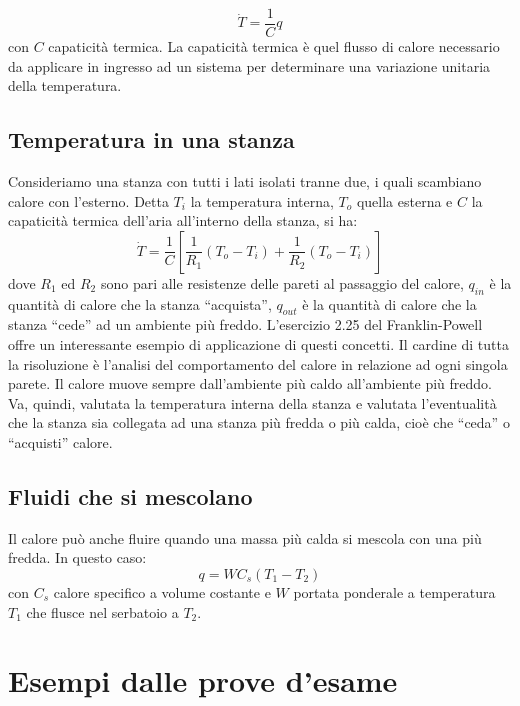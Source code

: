 \documentclass[a4paper]{report}
\begin{document}
\begin{equation}
\dot{T} = \frac{1}{C}q
\end{equation}
con $C$ capaticit\`a termica. La capaticit\`a termica \`e quel flusso
di calore necessario da applicare in ingresso ad un sistema per
determinare una variazione unitaria della temperatura.

\subsection{Temperatura in una stanza}
Consideriamo una stanza con tutti i lati isolati tranne due, i quali
scambiano calore con l'esterno. Detta $T_i$ la temperatura interna,
$T_o$ quella esterna e $C$ la capaticit\`a termica dell'aria
all'interno della stanza, si ha:
\begin{equation}
  \dot{T} = \frac{1}{C} \left[ \frac{1}{R_1}(T_o - T_i) +
    \frac{1}{R_2}(T_o - T_i) \right] 
\end{equation}
dove $R_1$ ed $R_2$ sono pari alle resistenze delle pareti al passaggio del
calore, $q_{in}$ \`e la quantit\`a di calore che la stanza
``acquista'', $q_{out}$ \`e la quantit\`a di calore che la stanza ``cede''
ad un ambiente pi\`u freddo. L'esercizio 2.25 del Franklin-Powell offre un interessante
esempio di applicazione di questi concetti. Il cardine di tutta
la risoluzione \`e l'analisi del comportamento del calore in relazione
ad ogni singola parete. Il calore muove sempre dall'ambiente pi\`u caldo all'ambiente
pi\`u freddo. Va, quindi, valutata la temperatura interna della stanza
e valutata l'eventualit\`a che la stanza sia collegata ad una stanza
pi\`u fredda o pi\`u calda, cio\`e che ``ceda'' o ``acquisti'' calore.

\subsection{Fluidi che si mescolano}
Il calore pu\`o anche fluire quando una massa pi\`u calda si mescola
con una pi\`u fredda. In questo caso:
\begin{equation}
  q = W C_s (T_1 - T_2)
\end{equation}
con $C_s$ calore specifico a volume costante e $W$ portata ponderale a
temperatura $T_1$ che flusce nel serbatoio a $T_2$.

\section{Esempi dalle prove d'esame}
\end{document}
